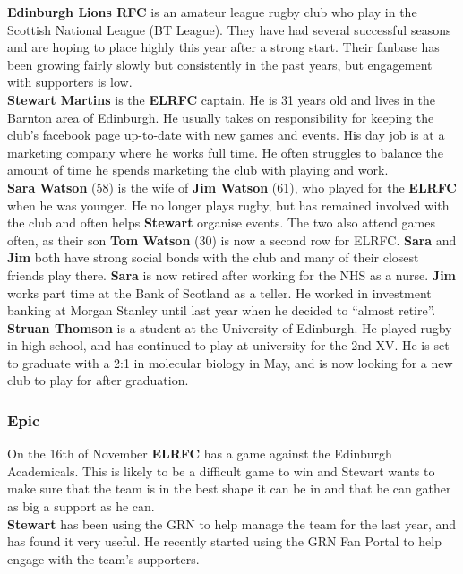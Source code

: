 \documentclass[10pt,a4paper]{article}
\begin{document}
\textbf{Edinburgh Lions RFC} is an amateur league rugby club who play in the Scottish National League (BT League). They have had several successful seasons and are hoping to place highly this year after a strong start. Their fanbase has been growing fairly slowly but consistently in the past years, but engagement with supporters is low. \\


\textbf{Stewart Martins} is the \textbf{ELRFC} captain. He is 31 years old and lives in the Barnton area of Edinburgh. He usually takes on responsibility for keeping the club’s facebook page up-to-date with new games and events. His day job is at a marketing company where he works full time. He often struggles to balance the amount of time he spends marketing the club with playing and work. \\


\textbf{Sara Watson} (58) is the wife of \textbf{Jim Watson} (61), who played for the \textbf{ELRFC} when he was younger. He no longer plays rugby, but has remained involved with the club and often helps \textbf{Stewart} organise events. The two also attend games often, as their son \textbf{Tom Watson} (30) is now a second row for ELRFC. \textbf{Sara} and \textbf{Jim} both have strong social bonds with the club and many of their closest friends play there. \textbf{Sara} is now retired after working for the NHS as a nurse. \textbf{Jim} works part time at the Bank of Scotland as a teller. He worked in investment banking at Morgan Stanley until last year when he decided to “almost retire”. \\


\textbf{Struan Thomson} is a student at the University of Edinburgh. He played rugby in high school, and has continued to play at university for the 2nd XV. He is set to graduate with a 2:1 in molecular biology in May, and is now looking for a new club to play for after graduation.\\

\subsubsection{Epic}
On the 16th of November \textbf{ELRFC} has a game against the Edinburgh Academicals. This is likely to be a difficult game to win and Stewart wants to make sure that the team is in the best shape it can be in and that he can gather as big a support as he can. \\

\textbf{Stewart} has been using the GRN to help manage the team for the last year, and has found it very useful. He recently started using the GRN Fan Portal to help engage with the team’s supporters. \\
\end{document}

